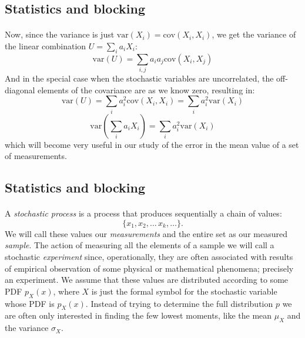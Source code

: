 \documentclass[%
twoside,                 %
final,                   %
10pt]{article}
\begin{document}
\subsection*{Statistics and blocking}

\paragraph{}
Now, since the variance is just $\mathrm{var}(X_i) = \mathrm{cov}(X_i, X_i)$, we get
the variance of the linear combination $U = \sum_i a_i X_i$:
\begin{equation}
\mathrm{var}(U) = \sum_{i,j}a_i a_j \mathrm{cov}(X_i, X_j)
\label{eq:variance_linear_combination}
\end{equation}
And in the special case when the stochastic variables are
uncorrelated, the off-diagonal elements of the covariance are as we
know zero, resulting in:
\[
\mathrm{var}(U) = \sum_i a_i^2 \mathrm{cov}(X_i, X_i) = \sum_i a_i^2 \mathrm{var}(X_i)
\]
\[
\mathrm{var}(\sum_i a_i X_i) = \sum_i a_i^2 \mathrm{var}(X_i)
\]
which will become very useful in our study of the error in the mean
value of a set of measurements.



\subsection*{Statistics and blocking}

\paragraph{}
A \emph{stochastic process} is a process that produces sequentially a
chain of values:
\[
\{x_1, x_2,\dots\,x_k,\dots\}.
\]
We will call these
values our \emph{measurements} and the entire set as our measured
\emph{sample}.  The action of measuring all the elements of a sample
we will call a stochastic \emph{experiment} since, operationally,
they are often associated with results of empirical observation of
some physical or mathematical phenomena; precisely an experiment. We
assume that these values are distributed according to some 
PDF $p_X^{\phantom X}(x)$, where $X$ is just the formal symbol for the
stochastic variable whose PDF is $p_X^{\phantom X}(x)$. Instead of
trying to determine the full distribution $p$ we are often only
interested in finding the few lowest moments, like the mean
$\mu_X^{\phantom X}$ and the variance $\sigma_X^{\phantom X}$.
\end{document}
